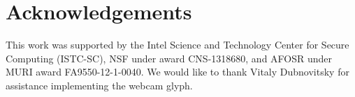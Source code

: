 \documentclass{sigchi}
\begin{document}



\section{Acknowledgements}

This work was supported by the Intel Science and Technology Center for Secure Computing (ISTC-SC), NSF under award CNS-1318680, and AFOSR under MURI award FA9550-12-1-0040. We would like to thank Vitaly Dubnovitsky for assistance implementing the webcam glyph.




\end{document}
